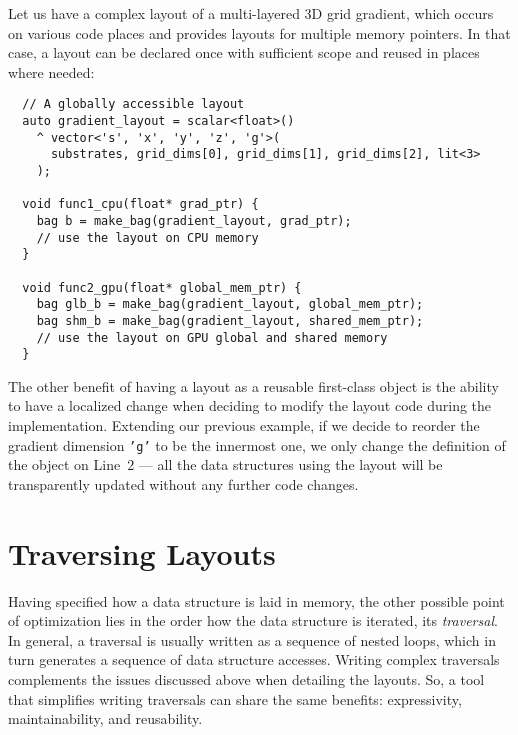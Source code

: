 Let us have a complex layout of a multi-layered 3D grid gradient, which occurs on various code places and provides layouts for multiple memory pointers. In that case, a layout can be declared once with sufficient scope and reused in places where needed:

\begin{verbatim}
  // A globally accessible layout
  auto gradient_layout = scalar<float>()
    ^ vector<'s', 'x', 'y', 'z', 'g'>(
      substrates, grid_dims[0], grid_dims[1], grid_dims[2], lit<3>
    );

  void func1_cpu(float* grad_ptr) {
    bag b = make_bag(gradient_layout, grad_ptr);
    // use the layout on CPU memory
  }

  void func2_gpu(float* global_mem_ptr) {
    bag glb_b = make_bag(gradient_layout, global_mem_ptr);
    bag shm_b = make_bag(gradient_layout, shared_mem_ptr);
    // use the layout on GPU global and shared memory
  }
\end{verbatim}

The other benefit of having a layout as a reusable first-class object is the ability to have a localized change when deciding to modify the layout code during the implementation. Extending our previous example, if we decide to reorder the gradient dimension \texttt{'g'} to be the innermost one, we only change the definition of the object on Line~$2$ --- all the data structures using the layout will be transparently updated without any further code changes.


\section{Traversing Layouts}
\label{sec:traversals}

Having specified how a data structure is laid in memory, the other possible point of optimization lies in the order how the data structure is iterated, its \emph{traversal}. In general, a traversal is usually written as a sequence of nested loops, which in turn generates a sequence of data structure accesses. Writing complex traversals complements the issues discussed above when detailing the layouts. So, a tool that simplifies writing traversals can share the same benefits: expressivity, maintainability, and reusability.

